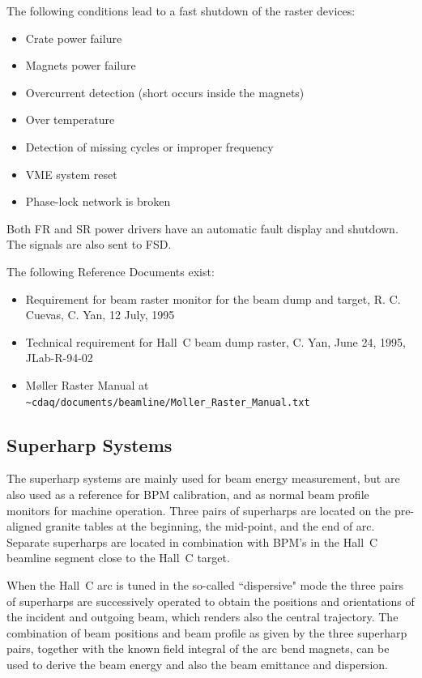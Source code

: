 The following conditions lead to a fast shutdown of the raster devices:
\begin{itemize}
\item{Crate power failure}
\item{Magnets power failure}
\item{Overcurrent detection (short occurs inside the magnets)}
\item{Over temperature}
\item{Detection of missing cycles or improper frequency}
\item{VME system reset}
\item{Phase-lock network is broken}
\end{itemize}

\noindent Both FR and SR power drivers have an automatic fault display and
shutdown. The signals are also sent to FSD.

The following Reference Documents exist:
\begin{itemize}
\item{Requirement for beam raster monitor for the beam dump and target,
R. C. Cuevas, C. Yan, 12 July, 1995}
\item{Technical requirement for Hall~C beam dump raster,
C. Yan, June 24, 1995, JLab-R-94-02}
\item{M\o ller Raster Manual at \verb|~cdaq/documents/beamline/Moller_Raster_Manual.txt|}
\end{itemize}

\subsection{Superharp Systems}

The superharp systems are mainly used for beam energy measurement,
but are also used as a reference for BPM calibration, and as
normal beam profile monitors for machine operation. Three pairs
of superharps are located on the pre-aligned granite tables at the
beginning, the mid-point, and the end of arc.
Separate superharps are located in combination with BPM's in the
Hall~C beamline segment close to the Hall~C target.

When the Hall~C arc is tuned in the so-called ``dispersive" mode
the three pairs of superharps are successively operated to obtain
the positions and orientations of the incident and outgoing beam,
which renders also the central trajectory. The combination of
beam positions and beam profile as given by the three superharp
pairs, together with the known field integral of the arc bend
magnets, can be used to derive the beam energy and also the beam
emittance and dispersion.

